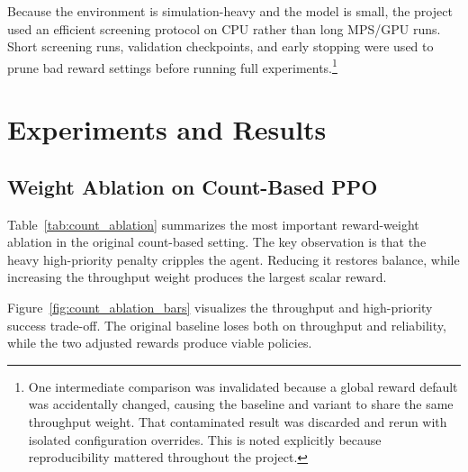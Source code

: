 \documentclass[conference]{IEEEtran}
\begin{document}
Because the environment is simulation-heavy and the model is small, the project used an efficient screening protocol on CPU rather than long MPS/GPU runs. Short screening runs, validation checkpoints, and early stopping were used to prune bad reward settings before running full experiments.\footnote{One intermediate comparison was invalidated because a global reward default was accidentally changed, causing the baseline and variant to share the same throughput weight. That contaminated result was discarded and rerun with isolated configuration overrides. This is noted explicitly because reproducibility mattered throughout the project.}

\section{Experiments and Results}
\subsection{Weight Ablation on Count-Based PPO}
Table~\ref{tab:count_ablation} summarizes the most important reward-weight ablation in the original count-based setting. The key observation is that the heavy high-priority penalty cripples the agent. Reducing it restores balance, while increasing the throughput weight produces the largest scalar reward.

\begin{table}[H]
\centering
\caption{High-load comparison for count-based PPO reward ablations. The original high-priority penalty ($3.1$) is overly conservative; lower penalty and higher throughput emphasis both recover much stronger operating points.}
\label{tab:count_ablation}
\end{table}

Figure~\ref{fig:count_ablation_bars} visualizes the throughput and high-priority success trade-off. The original baseline loses both on throughput and reliability, while the two adjusted rewards produce viable policies.
\end{document}
